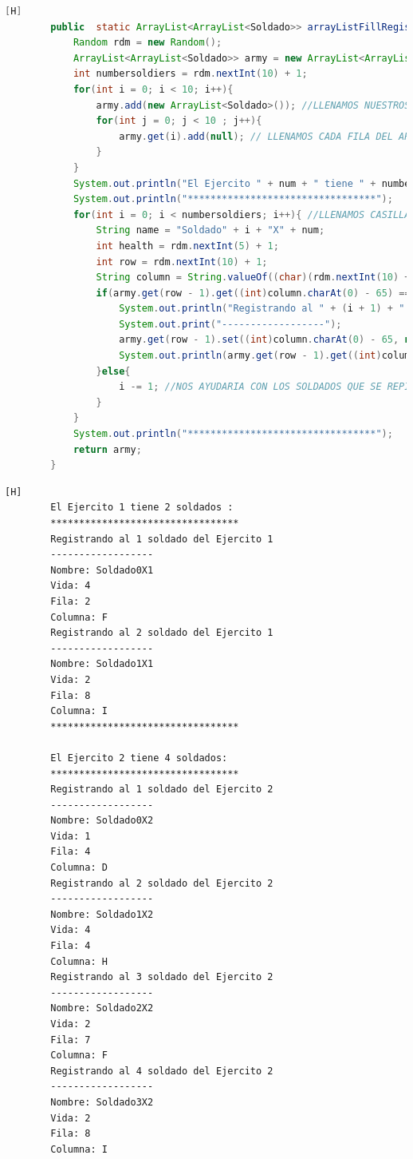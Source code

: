 \documentclass{article}
\begin{document}
	\begin{lstlisting}[language=java,caption={Las lineas de codigos del metodo creado:}][H]
		public  static ArrayList<ArrayList<Soldado>> arrayListFillRegister(int num){
			Random rdm = new Random();
			ArrayList<ArrayList<Soldado>> army = new ArrayList<ArrayList<Soldado>>();
			int numbersoldiers = rdm.nextInt(10) + 1;
			for(int i = 0; i < 10; i++){
				army.add(new ArrayList<Soldado>()); //LLENAMOS NUESTROS ARRAYLIST BIDIMENSIONAL CON CADA FILA PARA QUE CUMPLAN CON ESTRUCTURA DEL TABLERO
				for(int j = 0; j < 10 ; j++){
					army.get(i).add(null); // LLENAMOS CADA FILA DEL ARRAYLIST CON UN OBJETO SOLDADO CON TAL QUE ESTE SEA NULL PARA QUE SEPA QUE ESTE TIENE UNA CASILLA PERO NO HAY NADIE TODAVIA SE PUEDE LLENAR 
				}
			}
			System.out.println("El Ejercito " + num + " tiene " + numbersoldiers + " soldados : " ); 
			System.out.println("*********************************");
			for(int i = 0; i < numbersoldiers; i++){ //LLENAMOS CASILLAS CON CADA SOLDADO CREADO ALEATORIAMENTE
				String name = "Soldado" + i + "X" + num;
				int health = rdm.nextInt(5) + 1;
				int row = rdm.nextInt(10) + 1;
				String column = String.valueOf((char)(rdm.nextInt(10) + 65)); //REUTILIZAMOS CODIGO DEL ANTERIOR ARCHIVO VIDEOJUEGO3.JAVA YA QUE TENDRIAN LA MISMA FUNCIONALIDAD
				if(army.get(row - 1).get((int)column.charAt(0) - 65) == null){
					System.out.println("Registrando al " + (i + 1) + " soldado del Ejercito " + num + "");
					System.out.print("------------------");
					army.get(row - 1).set((int)column.charAt(0) - 65, new Soldado(name, health, row, column));
					System.out.println(army.get(row - 1).get((int)column.charAt(0) - 65).toString());
				}else{
					i -= 1; //NOS AYUDARIA CON LOS SOLDADOS QUE SE REPITEN EN EL MISMO CASILLERO CON TAL QUE NO DEBERIA CONTAR 
				}
			}
			System.out.println("*********************************");
			return army;
		}
	\end{lstlisting}
	\begin{lstlisting}[language=bash,caption={Ejecucion:}][H]
		El Ejercito 1 tiene 2 soldados : 
		*********************************
		Registrando al 1 soldado del Ejercito 1
		------------------
		Nombre: Soldado0X1
		Vida: 4
		Fila: 2
		Columna: F
		Registrando al 2 soldado del Ejercito 1
		------------------
		Nombre: Soldado1X1
		Vida: 2
		Fila: 8
		Columna: I
		*********************************

		El Ejercito 2 tiene 4 soldados:
		*********************************
		Registrando al 1 soldado del Ejercito 2
		------------------
		Nombre: Soldado0X2
		Vida: 1
		Fila: 4
		Columna: D
		Registrando al 2 soldado del Ejercito 2
		------------------
		Nombre: Soldado1X2
		Vida: 4
		Fila: 4
		Columna: H
		Registrando al 3 soldado del Ejercito 2
		------------------
		Nombre: Soldado2X2
		Vida: 2
		Fila: 7
		Columna: F
		Registrando al 4 soldado del Ejercito 2
		------------------
		Nombre: Soldado3X2
		Vida: 2
		Fila: 8
		Columna: I
	\end{lstlisting}
\end{document}
